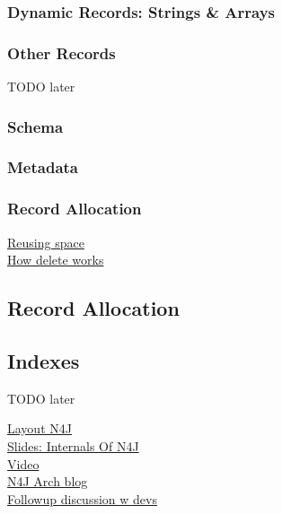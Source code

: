 \documentclass[a4paper,10pt]{article}
\begin{document}
    \subsubsection{Dynamic Records: Strings \& Arrays}\label{dynamic}
            
    \subsubsection{Other Records}
        TODO later
        \subsubsection{Schema}
        \subsubsection{Metadata}
        
        
    \subsubsection{Record Allocation}
        \href{https://neo4j.com/docs/operations-manual/current/performance/space-reuse/\#space-reuse}{Reusing space} \\
\href{https://neo4j.com/developer/kb/how-deletes-workin-neo4j/}{How delete works} \\
    
    \subsection{Record Allocation}

    \subsection{Indexes}
        TODO later
    

    
    
    


\href{https://neo4j.com/developer/kb/understanding-data-on-disk/}{Layout N4J} \\
\href{https://www.slideshare.net/thobe/an-overview-of-neo4j-internals}{Slides: Internals Of N4J} \\
\href{https://skillsmatter.com/skillscasts/2968-neo4j-internals}{Video} \\
\href{http://key-value-stories.blogspot.com/2015/02/neo4j-architecture.html}{N4J Arch blog} \\
\href{https://groups.google.com/g/neo4j/c/cxClivwF94k}{Followup discussion w devs}
\end{document}
